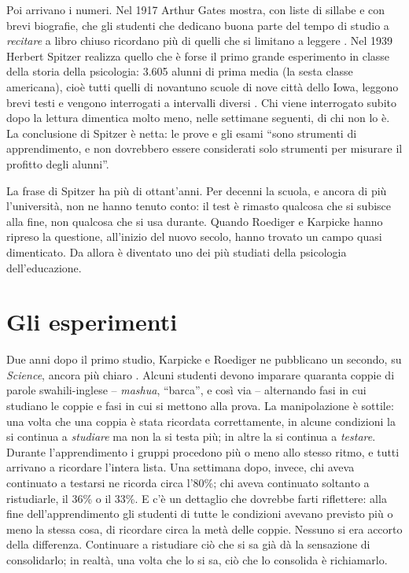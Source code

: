 Poi arrivano i numeri. Nel 1917 Arthur Gates mostra, con liste di
sillabe e con brevi biografie, che gli studenti che dedicano buona
parte del tempo di studio a \emph{recitare} a libro chiuso ricordano
più di quelli che si limitano a leggere \parencite{gates1917}. Nel 1939
Herbert Spitzer realizza quello che è forse il primo grande esperimento
in classe della storia della psicologia: 3.605 alunni di prima media
(la sesta classe americana), cioè tutti quelli di novantuno scuole di
nove città dello Iowa, leggono brevi testi e vengono interrogati a
intervalli diversi \parencite{spitzer1939}. Chi viene interrogato subito
dopo la lettura dimentica molto meno, nelle settimane seguenti, di chi
non lo è. La conclusione di Spitzer è netta: le prove e gli esami
\enquote{sono strumenti di apprendimento, e non dovrebbero essere
considerati solo strumenti per misurare il profitto degli alunni}.

La frase di Spitzer ha più di ottant'anni. Per decenni la scuola, e
ancora di più l'università, non ne hanno tenuto conto: il test è rimasto
qualcosa che si subisce alla fine, non qualcosa che si usa durante.
Quando Roediger e Karpicke hanno ripreso la questione, all'inizio del
nuovo secolo, hanno trovato un campo quasi dimenticato. Da allora è
diventato uno dei più studiati della psicologia dell'educazione.

\section{Gli esperimenti}

Due anni dopo il primo studio, Karpicke e Roediger ne pubblicano un
secondo, su \emph{Science}, ancora più chiaro \parencite{karpicke2008}.
Alcuni studenti devono imparare quaranta coppie di parole
swahili-inglese -- \emph{mashua}, \enquote{barca}, e così via --
alternando fasi in cui studiano le coppie e fasi in cui si mettono alla
prova. La manipolazione è sottile: una volta che una coppia è stata
ricordata correttamente, in alcune condizioni la si continua a
\emph{studiare} ma non la si testa più; in altre la si continua a
\emph{testare}. Durante l'apprendimento i gruppi procedono più o meno
allo stesso ritmo, e tutti arrivano a ricordare l'intera lista. Una settimana dopo, invece, chi aveva
continuato a testarsi ne ricorda circa l'80\%; chi aveva continuato
soltanto a ristudiarle, il 36\% o il 33\%. E c'è un dettaglio che
dovrebbe farti riflettere: alla fine dell'apprendimento gli studenti di
tutte le condizioni avevano previsto più o meno la stessa cosa, di
ricordare circa la metà delle coppie. Nessuno si era accorto della
differenza. Continuare a ristudiare ciò che si sa già dà la sensazione
di consolidarlo; in realtà, una volta che lo si sa, ciò che lo
consolida è richiamarlo.

